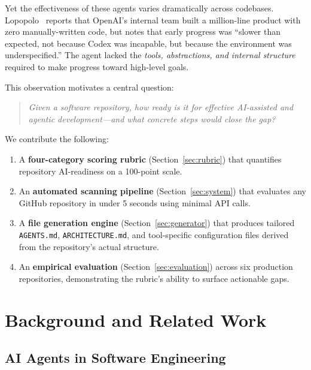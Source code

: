 \documentclass[11pt,twocolumn]{article}
\begin{document}
Yet the effectiveness of these agents varies dramatically across
codebases. Lopopolo~\citep{lopopolo2026harness} reports that OpenAI's
internal team built a million-line product with zero manually-written
code, but notes that early progress was ``slower than expected, not
because Codex was incapable, but because the environment was
underspecified.'' The agent lacked the \emph{tools, abstractions, and
internal structure} required to make progress toward high-level goals.

This observation motivates a central question:

\begin{quote}
\emph{Given a software repository, how ready is it for effective
AI-assisted and agentic development---and what concrete steps would
close the gap?}
\end{quote}

We contribute the following:

\begin{enumerate}[leftmargin=1.5em]
    \item A \textbf{four-category scoring rubric} (Section~\ref{sec:rubric})
          that quantifies repository AI-readiness on a 100-point scale.
    \item An \textbf{automated scanning pipeline} (Section~\ref{sec:system})
          that evaluates any GitHub repository in under 5 seconds using
          minimal API calls.
    \item A \textbf{file generation engine} (Section~\ref{sec:generator})
          that produces tailored \texttt{AGENTS.md}, \texttt{ARCHITECTURE.md},
          and tool-specific configuration files derived from the
          repository's actual structure.
    \item An \textbf{empirical evaluation} (Section~\ref{sec:evaluation})
          across six production repositories, demonstrating the rubric's
          ability to surface actionable gaps.
\end{enumerate}

\section{Background and Related Work}
\label{sec:related}

\subsection{AI Agents in Software Engineering}
\end{document}
